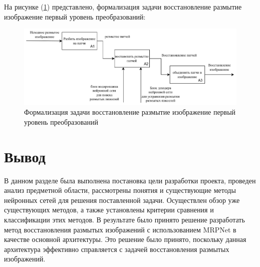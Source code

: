 На рисунке (\ref{fig:method-desc-a0}) представлено, формализация задачи восстановление размытие изображение первый уровень преобразований: 
\begin{figure}[H]
	\centering
	\includegraphics[width=1\linewidth]{assets/idef0-A1.png}
	\caption{Формализация задачи восстановление размытие изображение первый уровень преобразований}
	\label{fig:method-desc-a0}
\end{figure}

\section*{Вывод}

В данном разделе была выполнена постановка цели разработки проекта, проведен анализ предметной области, рассмотрены понятия и существующие методы нейронных сетей для решения поставленной задачи. Осуществлен обзор уже существующих методов, а также установлены критерии сравнения и классификации этих методов. В результате было принято решение разработать метод восстановления размытых изображений с использованием MRPNet в качестве основной архитектуры. Это решение было принято, поскольку данная архитектура эффективно справляется с задачей восстановления размытых изображений.